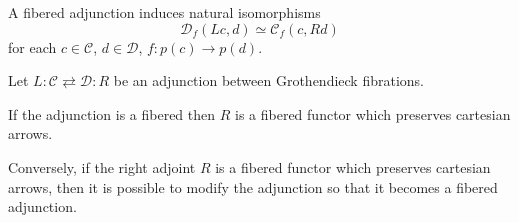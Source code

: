 \documentclass[a4paper,10pt
,draft
]{article}%
\renewcommand{\1}{\eta}%
\begin{document}
\begin{remark}
A fibered adjunction induces natural isomorphisms
\[
\mathcal{D}_f\left(Lc,d\right)
\simeq
\mathcal{C}_f\left(c,Rd\right)
\]
for each $c\in \mathcal{C}$, $d \in \mathcal{D}$, $f\colon p(c)\to p(d)$. 
\end{remark}



\begin{proposition}\label{FIBADJCAR PROP}
Let $L \colon \mathcal{C} \rightleftarrows \mathcal{D} \colon R$
be an adjunction between Grothendieck fibrations.

If the adjunction is a fibered then 
$R$ is 
a fibered functor which preserves cartesian arrows.

Conversely, if the right adjoint $R$ is 
a fibered functor which preserves cartesian arrows, then it is possible to modify the adjunction so that it becomes a fibered adjunction.
\end{proposition}
\end{document}
